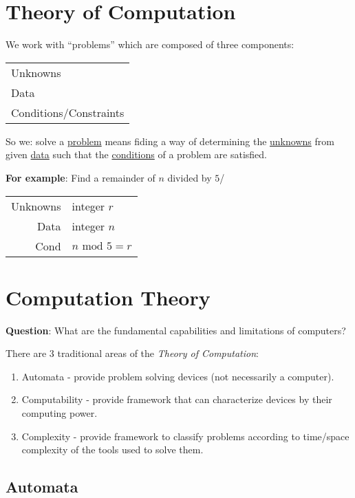 \documentclass{article}
\begin{document}
\section*{Theory of Computation}

We work with ``problems'' which are composed of three components:

\begin{tabular}{l}
Unknowns \\
Data \\
Conditions/Constraints \\
\end{tabular}

So we: solve a \underline{problem} means fiding a way of determining
the \underline{unknowns} from given \underline{data} such that the
\underline{conditions} of a problem are satisfied.

\textbf{For example}: Find a remainder of $n$ divided by $5$/

\begin{tabular}{r|l}
Unknowns & integer $r$ \\
Data & integer $n$ \\
Cond & $n\text{ mod }5=r$ \\
\end{tabular}

\section*{Computation Theory}

\textbf{Question}: What are the fundamental capabilities and
limitations of computers?

There are $3$ traditional areas of the \textit{Theory of Computation}:

\begin{enumerate}
\item Automata - provide problem solving devices (not necessarily a
  computer).

\item Computability - provide framework that can characterize devices
  by their computing power.

\item Complexity - provide framework to classify problems according to
  time/space complexity of the tools used to solve them.
\end{enumerate}

\subsection*{Automata}
\end{document}
